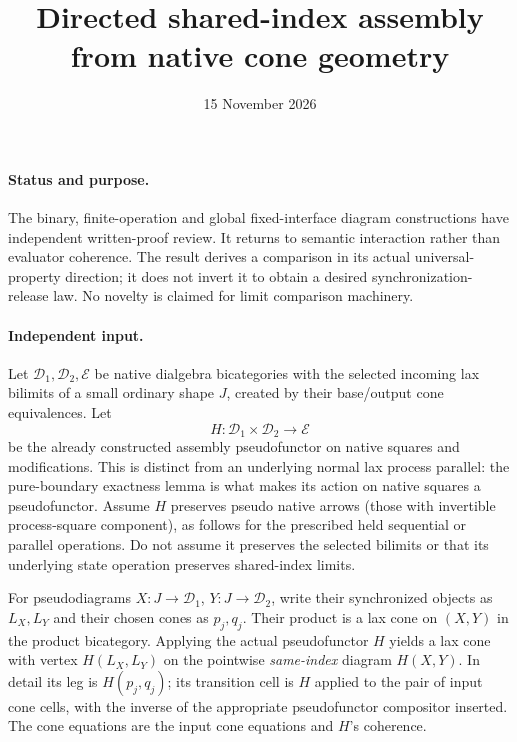 \documentclass{article}
\title{Directed shared-index assembly from native cone geometry}
\date{15 November 2026}
\begin{document}
\maketitle
\paragraph{Status and purpose.} The binary, finite-operation and global fixed-interface diagram constructions have independent written-proof review. It returns to semantic interaction rather than evaluator coherence. The result derives a comparison in its actual universal-property direction; it does not invert it to obtain a desired synchronization-release law. No novelty is claimed for limit comparison machinery.

\paragraph{Independent input.} Let $\mathcal D_1,\mathcal D_2,\mathcal E$ be native dialgebra bicategories with the selected incoming lax bilimits of a small ordinary shape $J$, created by their base/output cone equivalences. Let
\[
 H:\mathcal D_1\times\mathcal D_2\longrightarrow\mathcal E
\]
be the already constructed assembly pseudofunctor on native squares and modifications. This is distinct from an underlying normal lax process parallel: the pure-boundary exactness lemma is what makes its action on native squares a pseudofunctor. Assume $H$ preserves pseudo native arrows (those with invertible process-square component), as follows for the prescribed held sequential or parallel operations. Do not assume it preserves the selected bilimits or that its underlying state operation preserves shared-index limits.

For pseudodiagrams $X:J\to\mathcal D_1$, $Y:J\to\mathcal D_2$, write their synchronized objects as $L_X,L_Y$ and their chosen cones as $p_j,q_j$. Their product is a lax cone on $(X,Y)$ in the product bicategory. Applying the actual pseudofunctor $H$ yields a lax cone with vertex $H(L_X,L_Y)$ on the pointwise \emph{same-index} diagram $H(X,Y)$. In detail its leg is $H(p_j,q_j)$; its transition cell is $H$ applied to the pair of input cone cells, with the inverse of the appropriate pseudofunctor compositor inserted. The cone equations are the input cone equations and $H$'s coherence.
\end{document}
